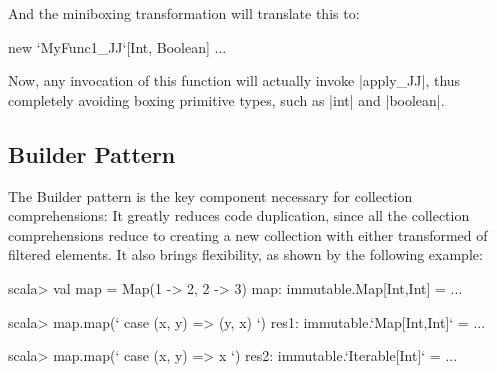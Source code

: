And the miniboxing transformation will translate this to:

\begin{lstlisting-nobreak}
 new `MyFunc1_JJ`[Int, Boolean] { ... }
\end{lstlisting-nobreak}

Now, any invocation of this function will actually invoke |apply_JJ|, thus completely avoiding boxing primitive types, such as |int| and |boolean|.

%

\subsection{Builder Pattern}

The Builder pattern is the key component necessary for collection comprehensions: It greatly reduces code duplication, since all the collection comprehensions reduce to creating a new collection with either transformed of filtered elements. It also brings flexibility, as shown by the following example:

\begin{lstlisting-nobreak}
scala> val map = Map(1 -> 2, 2 -> 3)
map: immutable.Map[Int,Int] = ...

scala> map.map(`{ case (x, y) => (y, x) }`)
res1: immutable.`Map[Int,Int]` = ...

scala> map.map(`{ case (x, y) => x }`)
res2: immutable.`Iterable[Int]` = ...
\end{lstlisting-nobreak}


%


